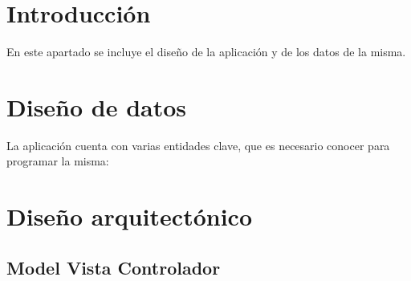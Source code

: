 \section{Introducción}\label{introducciondiseno}
En este apartado se incluye el diseño de la aplicación y de los datos de la misma. 

\section{Diseño de datos}\label{datos}
La aplicación cuenta con varias entidades clave, que es necesario conocer para programar la misma:





\begin{landscape}

  \end{landscape}

\section{Diseño arquitectónico}\label{darquitectura}

\subsection{Model Vista Controlador}\label{modelovista}

